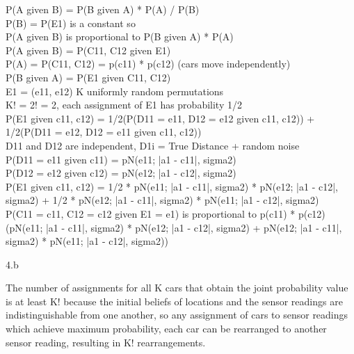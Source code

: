 \begin{answer}
  P(A given B) = P(B given A) * P(A) / P(B) \\
  P(B) = P(E1) is a constant so \\
  P(A given B) is proportional to P(B given A) * P(A) \\
  P(A given B) = P(C11, C12 given E1) \\
  P(A) = P(C11, C12) = p(c11) * p(c12) (cars move independently) \\
  
  P(B given A) = P(E1 given C11, C12) \\
  E1 = (e11, e12) K uniformly random permutations \\
  K! = 2! = 2, each assignment of E1 has probability 1/2 \\
  P(E1 given c11, c12) = 1/2(P(D11 = e11, D12 = e12 given c11, c12)) + 1/2(P(D11 = e12, D12 = e11 given c11, c12)) \\
  
  D11 and D12 are independent, D1i = True Distance + random noise \\
  P(D11 = e11 given c11) = pN(e11; |a1 - c11|, sigma2) \\
  P(D12 = e12 given c12) = pN(e12; |a1 - c12|, sigma2) \\
  
  P(E1 given c11, c12) = 1/2 * pN(e11; |a1 - c11|, sigma2) * pN(e12; |a1 - c12|, sigma2) + 1/2 * pN(e12; |a1 - c11|, sigma2) * pN(e11; |a1 - c12|, sigma2) \\
  
  P(C11 = c11, C12 = c12 given E1 = e1) is proportional to p(c11) * p(c12) (pN(e11; |a1 - c11|, sigma2) * pN(e12; |a1 - c12|, sigma2) + pN(e12; |a1 - c11|, sigma2) * pN(e11; |a1 - c12|, sigma2))
\end{answer}
\clearpage

\LARGE
4.b
\normalsize

\begin{answer}
  The number of assignments for all K cars that obtain the joint probability value is at least K! because the initial beliefs of locations and the sensor readings are indistinguishable from one another, so any assignment of cars to sensor readings which achieve maximum probability, each car can be rearranged to another sensor reading, resulting in K! rearrangements.
\end{answer}
\clearpage

